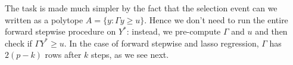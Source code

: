 \documentclass{article}
\begin{document}
\begin{appendix}
The task is made much simpler by the fact that the selection event can we written as a polytope $A=\{y: \Gamma y \geq u\}$. Hence we don't need to run the entire forward stepwise procedure on $Y^*$: instead, we pre-compute $\Gamma$ and $u$ and then check if $\Gamma Y^* \geq u$. In the case of forward stepwise and lasso regression, $\Gamma$ has $2(p-k)$ rows after $k$ steps, as we see next.


\end{appendix}
\end{document}
